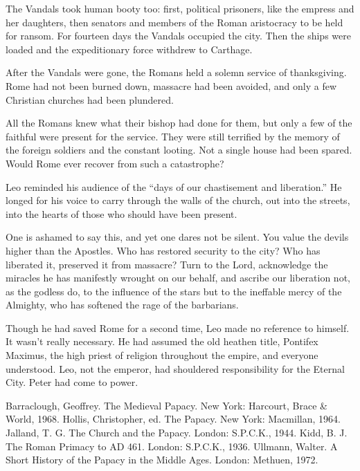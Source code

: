 The Vandals took human booty too: first, political prisoners, like the empress and her daughters,
then senators and members of the Roman aristocracy to be held for ransom. For fourteen days the
Vandals occupied the city. Then the ships were loaded and the expeditionary force withdrew to
Carthage.

After the Vandals were gone, the Romans held a solemn service of thanksgiving. Rome had not been
burned down, massacre had been avoided, and only a few Christian churches had been plundered.

All the Romans knew what their bishop had done for them, but only a few of the faithful were present
for the service. They were still terrified by the memory of the foreign soldiers and the constant
looting. Not a single house had been spared. Would Rome ever recover from such a catastrophe?

Leo reminded his audience of the “days of our chastisement and liberation.” He longed for his voice
to carry through the walls of the church, out into the streets, into the hearts of those who should
have been present.

\begin{blockquote}
One is ashamed to say this, and yet one dares not be silent. You value the devils higher than the
Apostles. Who has restored security to the city? Who has liberated it, preserved it from massacre?
Turn to the Lord, acknowledge the miracles he has manifestly wrought on our behalf, and ascribe our
liberation not, as the godless do, to the influence of the stars but to the ineffable mercy of the
Almighty, who has softened the rage of the barbarians.
\end{blockquote}

Though he had saved Rome for a second time, Leo made no reference to himself. It wasn’t really
necessary. He had assumed the old heathen title, Pontifex Maximus, the high priest of religion
throughout the empire, and everyone understood. Leo, not the emperor, had shouldered responsibility
for the Eternal City. Peter had come to power.

\begin{readinglist}
\entry Barraclough, Geoffrey. The Medieval Papacy. New York: Harcourt, Brace \& World, 1968.
\entry Hollis, Christopher, ed. The Papacy. New York: Macmillan, 1964.
\entry Jalland, T. G. The Church and the Papacy. London: S.P.C.K., 1944.
\entry Kidd, B. J. The Roman Primacy to AD 461. London: S.P.C.K., 1936.
\entry Ullmann, Walter. A Short History of the Papacy in the Middle Ages. London: Methuen, 1972.
\end{readinglist}
